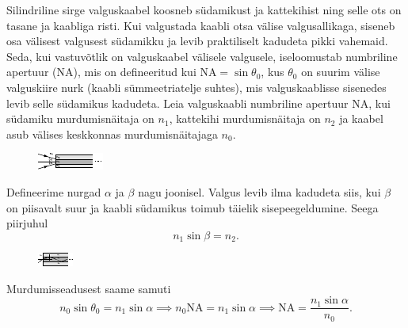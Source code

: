 
Silindriline sirge valguskaabel koosneb südamikust ja kattekihist ning selle ots on tasane ja kaabliga risti. Kui valgustada kaabli otsa välise valgusallikaga, siseneb osa välisest valgusest südamikku ja levib praktiliselt kadudeta pikki vahemaid. Seda, kui vastuvõtlik on valguskaabel välisele valgusele, iseloomustab numbriline apertuur (NA), mis on defineeritud kui $\text{NA} = \sin \theta_0$, kus $\theta_0$ on suurim välise valguskiire nurk (kaabli sümmeetriatelje suhtes), mis valguskaablisse sisenedes levib selle südamikus kadudeta. Leia valguskaabli numbriline apertuur NA, kui südamiku murdumisnäitaja on $n_1$, kattekihi murdumisnäitaja on $n_2$ ja kaabel asub välises keskkonnas murdumisnäitajaga $n_0$.
\begin{figure}[h]
    \centering
    \includegraphics[width=.7\linewidth]{2024-lahg-03-yl.pdf}
\end{figure}




\hint

\solu
Defineerime nurgad $\alpha$ ja $\beta$ nagu joonisel. Valgus levib ilma kadudeta siis, kui $\beta$ on piisavalt suur ja kaabli südamikus toimub täielik sisepeegeldumine. Seega piirjuhul
\begin{equation*}
    n_1 \sin \beta = n_2.
\end{equation*}

\begin{figure}[h]
    \centering
    \includegraphics[width=.7\linewidth]{2024-lahg-03-sol.pdf}
\end{figure}

Murdumisseadusest saame samuti
\begin{equation*}
    n_0 \sin \theta_0 = n_1 \sin \alpha \implies n_0 \text{NA} = n_1 \sin \alpha \implies \text{NA} = \frac{n_1 \sin \alpha}{n_0}.
\end{equation*}

